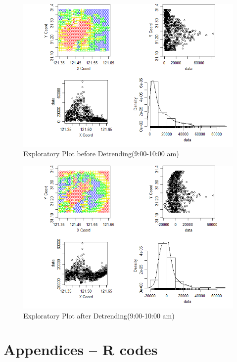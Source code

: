 \documentclass[hidelinks,12pt]{article}
\begin{document}
\begin{figure}[!ht]
		\includegraphics[width=\textwidth]{geo9.png}
		\caption{Exploratory Plot before Detrending(9:00-10:00 am) \label{fig:geo9}}
\end{figure}
\FloatBarrier

\begin{figure}[!ht]
		\includegraphics[width=\textwidth]{gres9.png}
		\caption{Exploratory Plot after Detrending(9:00-10:00 am)\label{fig:gres9}}
\end{figure}
\FloatBarrier
	
	
	

	\section{Appendices -- R codes}
	\begin{verbatim}
		
	\end{verbatim}
	
\end{document}
